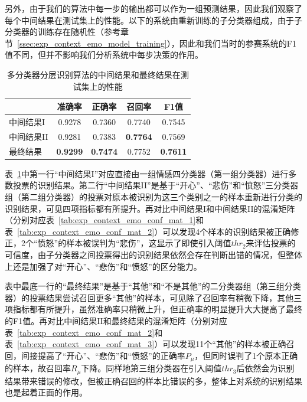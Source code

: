 另外，由于我们的算法中每一步的输出都可以作为一组预测结果，因此我们观察了每个中间结果在测试集上的性能。以下的系统由重新训练的子分类器组成，由于子分类器的训练存在随机性（参考章节~\ref{ssec:exp_context_emo_model_training}），因此和我们当时的参赛系统的F1值不同，但并不影响我们分析系统中每步决策的作用。

\begin{table}[htb]
  \centering
  \begin{minipage}[t]{0.6\linewidth}
  \caption{多分类器分层识别算法的中间结果和最终结果在测试集上的性能}
  \label{tab:exp_context_emo_ensemble_result}
    \begin{tabularx}{\linewidth}{X|cccc}
    \toprule[1.5pt]
    & 准确率 & 正确率 & 召回率 & F1值 \\
    \hline
    中间结果I & 0.9278 & 0.7360 & 0.7740 & 0.7545 \\
    中间结果II & 0.9281 & 0.7383 & \bf 0.7764 & 0.7569 \\
    \hline
    最终结果 & \bf 0.9299 & \bf 0.7474 & 0.7752 & \bf 0.7611 \\ 
    \bottomrule[1.5pt]
    \end{tabularx}
  \end{minipage}
\end{table}

表~\ref{tab:exp_context_emo_ensemble_result}中第一行“中间结果I”对应直接由一组情感四分类器（第一组分类器）进行多数投票的识别结果。第二行“中间结果II”是基于“开心”、“悲伤”和“愤怒”三分类器组（第二组分类器）的投票对原本被识别为这三个类别之一的样本重新进行分类的识别结果，可见四项指标都有所提升。再对比中间结果I和中间结果II的混淆矩阵（分别对应表~\ref{tab:exp_context_emo_conf_mat_1}和表~\ref{tab:exp_context_emo_conf_mat_2}）可以发现4个样本的识别结果被正确修正，2个“愤怒”的样本被误判为“悲伤”，这显示了即使引入阈值$thr_2$来评估投票的可信度，由子分类器之间投票得出的识别结果依然会存在判断出错的情况，但整体上还是加强了对“开心”、“悲伤”和“愤怒”的区分能力。

表中最底一行的“最终结果”是基于“其他”和“不是其他”的二分类器组（第三组分类器）的投票结果尝试召回更多“其他”的样本，可见除了召回率有稍微下降，其他三项指标都有所提升，虽然准确率只稍微上升，但正确率的明显提升大大提高了最终的F1值。再对比中间结果II和最终结果的混淆矩阵（分别对应表~\ref{tab:exp_context_emo_conf_mat_2}和表~\ref{tab:exp_context_emo_conf_mat_3}）可以发现11个“其他”的样本被正确召回，间接提高了“开心”、“悲伤”和“愤怒”的正确率$P_\mu$，但同时误判了1个原本正确的样本，故召回率$R_\mu$下降。同样地第三组分类器在引入阈值$thr_3$后依然会为识别结果带来错误的修改，但被正确召回的样本比错误的多，整体上对系统的识别结果也是起着正面的作用。

